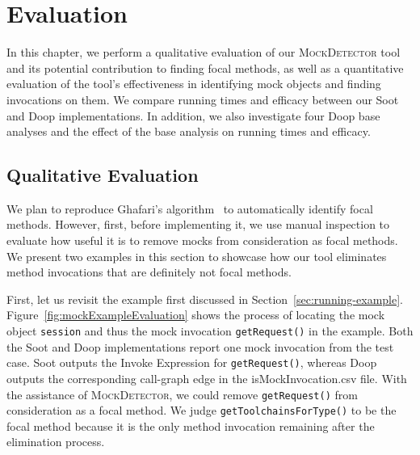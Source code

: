 \chapter{Evaluation}
\label{chap:evaluation}	

In this chapter, we perform a qualitative evaluation of our \textsc{MockDetector} tool and its potential contribution to finding focal methods, as well as a quantitative evaluation of the tool's effectiveness in identifying mock objects and finding invocations on them. We compare running times and efficacy between our Soot and Doop implementations. In addition, we also investigate four Doop base analyses and the effect of the base analysis on running times and efficacy.

\section{Qualitative Evaluation}

We plan to reproduce Ghafari's algorithm~\cite{ghafari15:_autom} to automatically identify focal methods. However, first, before implementing it, we use manual inspection to evaluate how useful it is to remove mocks from consideration as focal methods. We present two examples in this section to showcase how our tool eliminates method invocations that are definitely not focal methods.

First, let us revisit the example first discussed in Section~\ref{sec:running-example}. Figure~\ref{fig:mockExampleEvaluation} shows the process of locating the mock object \texttt{session} and thus the mock invocation \texttt{getRequest()} in the example. Both the Soot and Doop implementations report one mock invocation from the test case. Soot outputs the Invoke Expression for \texttt{getRequest()}, whereas Doop outputs the corresponding call-graph edge in the isMockInvocation.csv file. With the assistance of \textsc{MockDetector}, we could remove \texttt{getRequest()} from consideration as a focal method. We judge \texttt{getToolchainsForType()} to be the focal method because it is the only method invocation remaining after the elimination process. 

